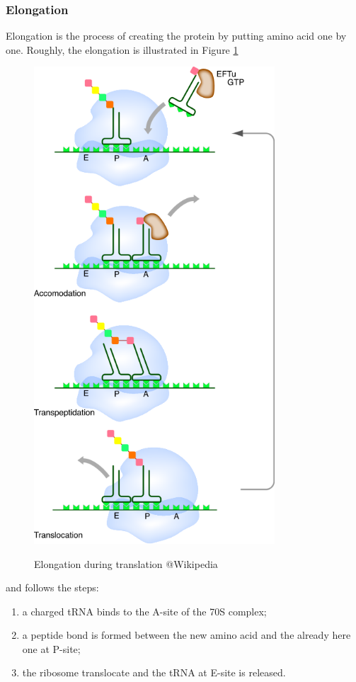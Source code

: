 \subsubsection{Elongation}
Elongation is the process of creating the protein by putting amino acid one by one. Roughly, the elongation is illustrated in Figure \ref{fig:elongationTranslate}
\begin{figure}[hbtp]
  \centering
  \includegraphics[width=9cm]{figure/proteinTranslationFromWikipediaModif.png}\\
  \caption{Elongation during translation @Wikipedia}\label{fig:elongationTranslate}
\end{figure}
and follows the steps:
\begin{enumerate}
  \item a charged tRNA binds to the A-site of the 70S complex;
  \item a peptide bond is formed between the new amino acid and the already here one at P-site;
  \item the ribosome translocate and the tRNA at E-site is released.
\end{enumerate}
